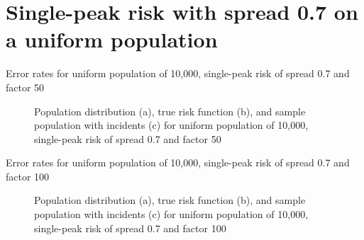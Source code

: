 \section{Single-peak risk with spread 0.7 on a uniform population}
\label{sec:app:results_unif_0.7_1h}

\graphicspath{{./results/unif_50_0.7_1h/}}
\makeatletter
{}
\makeatother

\begin{table}[H]
    
    \caption[]{Error rates for uniform population of 10,000, single-peak risk of spread 0.7 and \gls{factor} 50}
    \label{tab:mean_error_rates:unif_50_0.7_1h}
\end{table}

\begin{figure}[H]
    
    \caption[]{Population distribution (a), true risk function (b), and sample population with incidents (c) for uniform population of 10,000, single-peak risk of \gls{spread} 0.7 and \gls{factor} 50}
    \label{fig:distributions:unif_50_0.7_1h}    
\end{figure}


\graphicspath{{./results/unif_100_0.7_1h/}}
\makeatletter
{}
\makeatother

\begin{table}[H]

\caption[]{Error rates for uniform population of 10,000, single-peak risk of \gls{spread} 0.7 and \gls{factor} 100}
\label{tab:mean_error_rates:unif_100_0.7_1h}
\end{table}

\begin{figure}[H]
    
    \caption[]{Population distribution (a), true risk function (b), and sample population with incidents (c) for uniform population of 10,000, single-peak risk of \gls{spread} 0.7 and \gls{factor} 100}
    \label{fig:distributions:unif_100_0.7_1h}    
\end{figure}


\graphicspath{{./results/unif_200_0.7_1h/}}
\makeatletter
{}
\makeatother

